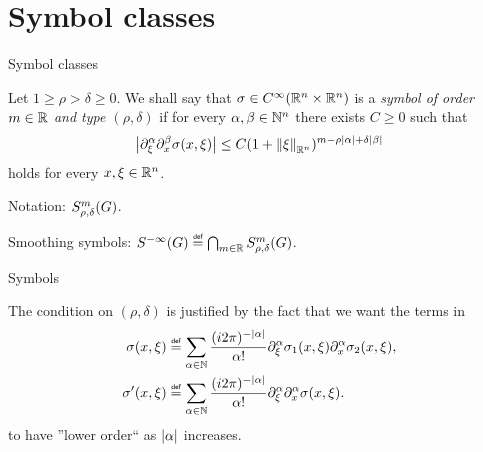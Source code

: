 \documentclass[handout]{beamer}
\begin{document}
\section{Symbol classes}

\begin{frame}
    {Symbol classes}

    \begin{definition}

        Let $1 \geq \rho > \delta \geq 0$.
        We shall say that $\sigma \in {C^\infty(\mathbb{R}^n \times \mathbb{R}^n)}$ is a \emph{symbol of order $m \in \mathbb{R}$ and type $(\rho, \delta)$}
        if for every $\alpha, \beta \in \mathbb{N}^n$
        there exists $C \geq 0$ such that
        \begin{align*}
            \abs {%
                \iD {\xi^\alpha}
                \iD {x^\beta}
                \sigma(x, \xi)
            } \leq
            C (1 + \norm [\R^n] \xi)^{m - \rho \abs \alpha + \delta \abs \beta}
        \end{align*}
        holds for every $x, \xi \in \mathbb{R}^n$.

        \pause
        Notation: $S^{m}_{\rho, \delta}(G)$.
    \end{definition}

    \pause
    Smoothing symbols: $\SmoothingSymbols \defeq \bigcap_{m \in \R} \SymbolClass m {\rho, \delta}$.
\end{frame}

\begin{frame}
    {Symbols}

    The condition on $(\rho, \delta)$ is justified by the fact that we want the terms in
    \begin{align}
        \sigma(x, \xi)
        &\defeq
        \sum_{\alpha \in \N}
        \frac {(i \turn)^{-\abs \alpha}} {\alpha!}
        \iD {\xi^\alpha} \sigma_1(x, \xi)
        \iD {x^\alpha} \sigma_2(x, \xi),\\
        \sigma'(x, \xi)
        &\defeq
        \sum_{\alpha \in \N}
        \frac {(i \turn)^{-\abs \alpha}} {\alpha!}
        \iD {\xi^\alpha}
        \iD {x^\alpha} \sigma(x, \xi).
    \end{align}
    to have ''lower order`` as $\left|{\alpha}\right|$ increases.
\end{frame}
\end{document}
